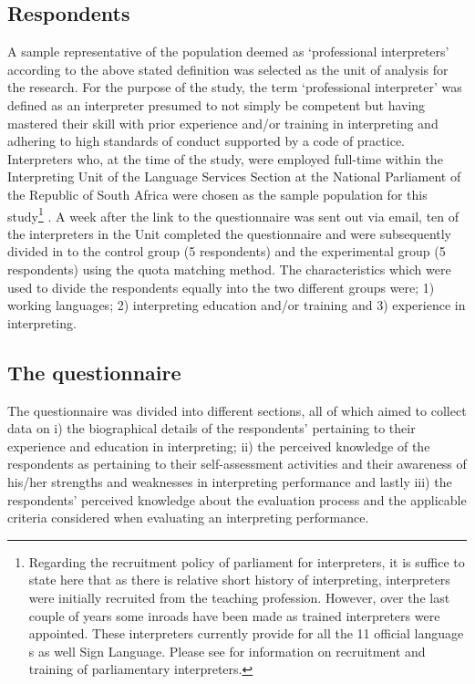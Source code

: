 \documentclass[output=paper]{langsci/langscibook}
\begin{document}
\subsection{Respondents}
A sample representative of the population deemed as ‘professional interpreters’ according to the above stated definition was selected as the unit of analysis for the research. For the purpose of the study, the term ‘professional interpreter’ was defined as an interpreter presumed to not simply be competent but having mastered their skill with prior experience and/or training in interpreting and adhering to high standards of conduct supported by a code of practice. Interpreters who, at the time of the study, were employed full-time within the Interpreting Unit of the Language Services Section at the National Parliament of the Republic of South Africa were chosen as the sample population for this study\footnote{Regarding the recruitment policy of parliament for interpreters, it is suffice to state here that as there is relative short history of interpreting, interpreters were initially recruited from the teaching profession. However, over the last couple of years some inroads have been made as trained interpreters were appointed. These interpreters currently provide for all the 11 official language s as well Sign Language.  Please see \citet{Lesch2010} for information on recruitment and training of parliamentary interpreters.} . A week after the link to the questionnaire was sent out via email, ten of the interpreters in the Unit completed the questionnaire and were subsequently divided in to the control group (5 respondents) and the experimental group (5 respondents) using the quota matching method.  The characteristics which were used to divide the respondents equally into the two different groups were; 1) working languages; 2) interpreting education and/or training and 3) experience in interpreting.

\subsection{The questionnaire}
The questionnaire was divided into different sections, all of which aimed to collect data on i) the biographical details of the respondents’ pertaining to their experience and education in interpreting; ii) the perceived knowledge of the respondents as pertaining to their self-assessment activities and their awareness of his/her strengths and weaknesses in interpreting performance and lastly iii) the respondents’ perceived knowledge about  the evaluation process and the applicable criteria considered when evaluating an interpreting performance. 
\end{document}
